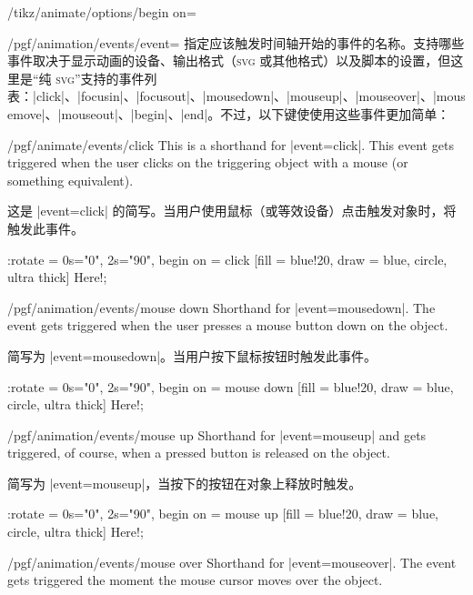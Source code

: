 \begin{key}{/tikz/animate/options/begin on=}
\begin{key}{/pgf/animation/events/event=}
        指定应该触发时间轴开始的事件的名称。支持哪些事件取决于显示动画的设备、输出格式（\textsc{svg} 或其他格式）以及脚本的设置，但这里是“纯 \textsc{svg}”支持的事件列表：|click|、|focusin|、|focusout|、|mousedown|、|mouseup|、|mouseover|、|mousemove|、|mouseout|、|begin|、|end|。不过，以下键使使用这些事件更加简单：


        \begin{key}{/pgf/animate/events/click}
            This is a shorthand for |event=click|. This event gets triggered
            when the user clicks on the triggering object with a mouse (or
            something equivalent).
            
            这是 |event=click| 的简写。当用户使用鼠标（或等效设备）点击触发对象时，将触发此事件。


\begin{codeexample}[width=2cm,preamble={\usetikzlibrary{animations}}]
\tikz \node :rotate = { 0s="0", 2s="90", begin on = {click}}
  [fill = blue!20, draw = blue, circle, ultra thick] {Here!};
\end{codeexample}
        \end{key}
        \begin{key}{/pgf/animation/events/mouse down}
            Shorthand for |event=mousedown|. The event gets triggered when the
            user presses a mouse button down on the object.
            
            简写为 |event=mousedown|。当用户按下鼠标按钮时触发此事件。

\begin{codeexample}[width=2cm,preamble={\usetikzlibrary{animations}}]
\tikz \node :rotate = { 0s="0", 2s="90", begin on = {mouse down}}
  [fill = blue!20, draw = blue, circle, ultra thick] {Here!};
\end{codeexample}
        \end{key}
        \begin{key}{/pgf/animation/events/mouse up}
            Shorthand for |event=mouseup| and gets triggered, of course, when a
            pressed button is released on the object.
            
            简写为 |event=mouseup|，当按下的按钮在对象上释放时触发。

\begin{codeexample}[width=2cm,preamble={\usetikzlibrary{animations}}]
\tikz \node :rotate = { 0s="0", 2s="90", begin on = {mouse up} }
  [fill = blue!20, draw = blue, circle, ultra thick] {Here!};
\end{codeexample}
        \end{key}
        \begin{key}{/pgf/animation/events/mouse over}
            Shorthand for |event=mouseover|. The event gets triggered the
            moment the mouse cursor moves over the object.
            

\end{key}
\end{key}
\end{key}
